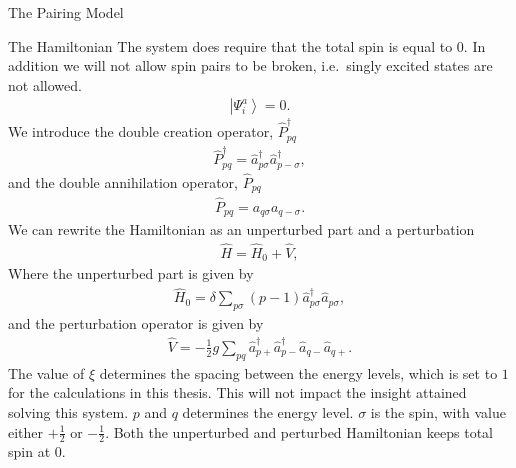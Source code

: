 \documentclass[twoside,english]{uiofysmaster}
\begin{document}
\begin{chapter}{The Pairing Model}
\begin{section}{The Hamiltonian}
		The system does require that the total spin is equal
                to $0$. In addition we will not allow spin pairs to be
                broken, i.e.\ singly excited states are not allowed.
		\begin{align}
			\left| \Psi_i^a \right> = 0.
		\end{align}	
		We introduce the double creation operator, $\hat P_{pq}^{\dagger}$
		\begin{align}
			\hat P_{pq}^{\dagger} = \hat a_{p \sigma}^{\dagger} \hat a_{p -\sigma}^{\dagger},
		\end{align}
		and the double annihilation operator, $\hat P_{pq}$
		\begin{align}
			\hat P_{pq} =  a_{q \sigma} a_{q -\sigma}.
		\end{align}
		We can rewrite the Hamiltonian as an unperturbed part and a perturbation
		\begin{align}
			\hat H = \hat H_0 + \hat V,
		\end{align}
		Where the unperturbed part is given by 
		\begin{align}
			\hat H_0 = \delta \sum_{p \sigma} (p-1) \hat a_{p \sigma}^{\dagger} \hat a_{p \sigma},
		\end{align}
		and the perturbation operator is given by
		\begin{align}
			\hat V = - \frac{1}{2}g \sum_{pq} \hat a_{p +}^{\dagger} \hat a_{p-}^{\dagger} \hat a_{q-} \hat a_{q+}.
		\end{align}
		The value of $\xi$ determines the spacing between the energy levels, which is set to $1$ for the calculations in this thesis. This will not impact the insight attained solving this system. $p$ and $q$ determines the energy level. $\sigma$ is the spin, with value either $+\frac{1}{2}$ or $-\frac{1}{2}$. Both the unperturbed and perturbed Hamiltonian keeps total spin at $0$.


\end{section}
\end{chapter}
\end{document}

